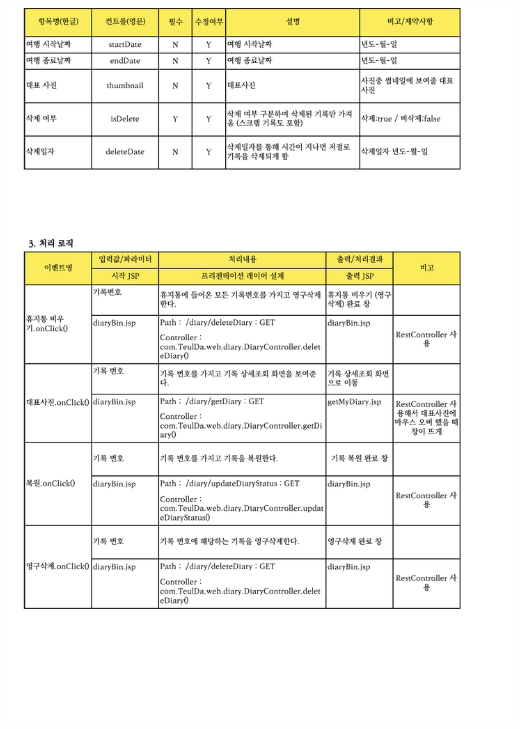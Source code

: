 {{{{{{{{{{{{{{{{{{{\includegraphics[width=20cm]{./Figure/Analysis/Display/diary/diary_18.pdf} \\
}}}}}}}}}}}}}}}}}}}

